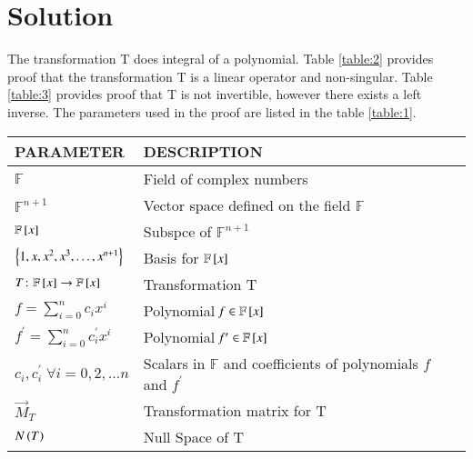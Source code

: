 \documentclass[journal,12pt,twocolumn]{IEEEtran}
\numberwithin{table}{section}
\begin{document}
\section{Solution}
The transformation T does integral of a polynomial. Table \ref{table:2} provides proof that the transformation T is a linear operator and non-singular. Table \ref{table:3} provides proof that T is not invertible, however there exists a left inverse. The parameters used in the proof are listed in the table \ref{table:1}.
\renewcommand{\thetable}{1}
\begin{table*}[ht!]
\begin{center}
\begin{tabular}{|l|l|}
\hline
\textbf{PARAMETER} & \textbf{DESCRIPTION}\\[0.5ex]
\hline
$\mathbb{F}$ & Field of complex numbers\\[0.5ex]
\hline
$\mathbb{F}^{n+1}$ & Vector space defined on the field $\mathbb{F}$\\[0.5ex]
\hline
$\mathbb{F}{}\left[x\right]$ & Subspce of $\mathbb{F}^{n+1}$ \\[0.5ex] 
\hline
$\left\{1,x,x^2,x^3,\hdots,x^{n+1}\right\}$ & Basis for $\mathbb{F}{}\left[x\right]$ \\[0.5ex] 
\hline
$T\colon \mathbb{F}{}\left[x\right] \rightarrow \mathbb{F}{}\left[x\right]$ & Transformation T\\[0.5ex] 
\hline
$\mathit{f}=\sum \limits_{i=0}^n c_i x^i$ & Polynomial $\mathit{f} \in \mathbb{F}{}\left[x\right]$\\[0.5ex] 
\hline
$\mathit{f^\prime}=\sum \limits_{i=0}^n c^\prime_i x^i$ & Polynomial $\mathit{f^\prime} \in \mathbb{F}{}\left[x\right]$\\[0.5ex] 
\hline
$c_i,c^\prime_i \; \forall i=0,2,\hdots n$ & Scalars in $\mathbb{F}$ and coefficients of polynomials $\mathit{f}$ and $\mathit{f^\prime}$\\[0.5ex] 
\hline
$\vec{M}_T$ & Transformation matrix for T\\[0.5ex] 
\hline
$N\left(T\right)$ & Null Space of T\\[0.5ex] 
\hline
\end{tabular}
\caption{Parameters}
\label{table:1}
\end{center}
\vspace{-0.5cm}
\end{table*}
\end{document}
